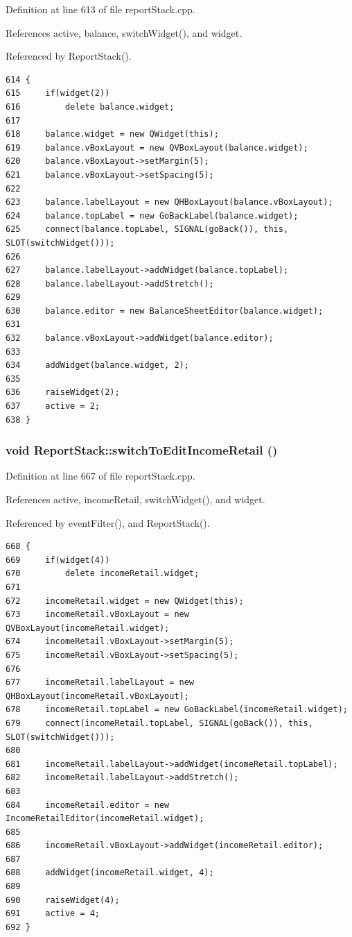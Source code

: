 Definition at line 613 of file report\-Stack.cpp.

References active, balance, switch\-Widget(), and widget.

Referenced by Report\-Stack().

\footnotesize\begin{verbatim}614 {
615     if(widget(2))
616         delete balance.widget;
617 
618     balance.widget = new QWidget(this);
619     balance.vBoxLayout = new QVBoxLayout(balance.widget);
620     balance.vBoxLayout->setMargin(5);
621     balance.vBoxLayout->setSpacing(5);
622     
623     balance.labelLayout = new QHBoxLayout(balance.vBoxLayout);
624     balance.topLabel = new GoBackLabel(balance.widget);
625     connect(balance.topLabel, SIGNAL(goBack()), this, SLOT(switchWidget()));
626     
627     balance.labelLayout->addWidget(balance.topLabel);
628     balance.labelLayout->addStretch();
629     
630     balance.editor = new BalanceSheetEditor(balance.widget);
631     
632     balance.vBoxLayout->addWidget(balance.editor);
633     
634     addWidget(balance.widget, 2);
635 
636     raiseWidget(2);
637     active = 2;
638 }
\end{verbatim}\normalsize 


\hypertarget{classReportStack_k16}{
\subsubsection[switchToEditIncomeRetail]{\setlength{\rightskip}{0pt plus 5cm}void Report\-Stack::switch\-To\-Edit\-Income\-Retail ()}}
\label{classReportStack_k16}


Definition at line 667 of file report\-Stack.cpp.

References active, income\-Retail, switch\-Widget(), and widget.

Referenced by event\-Filter(), and Report\-Stack().

\footnotesize\begin{verbatim}668 {
669     if(widget(4))
670         delete incomeRetail.widget;
671 
672     incomeRetail.widget = new QWidget(this);
673     incomeRetail.vBoxLayout = new QVBoxLayout(incomeRetail.widget);
674     incomeRetail.vBoxLayout->setMargin(5);
675     incomeRetail.vBoxLayout->setSpacing(5);
676     
677     incomeRetail.labelLayout = new QHBoxLayout(incomeRetail.vBoxLayout);
678     incomeRetail.topLabel = new GoBackLabel(incomeRetail.widget);
679     connect(incomeRetail.topLabel, SIGNAL(goBack()), this, SLOT(switchWidget()));
680     
681     incomeRetail.labelLayout->addWidget(incomeRetail.topLabel);
682     incomeRetail.labelLayout->addStretch();
683     
684     incomeRetail.editor = new IncomeRetailEditor(incomeRetail.widget);
685     
686     incomeRetail.vBoxLayout->addWidget(incomeRetail.editor);
687     
688     addWidget(incomeRetail.widget, 4);
689 
690     raiseWidget(4);
691     active = 4;
692 }
\end{verbatim}\normalsize 


